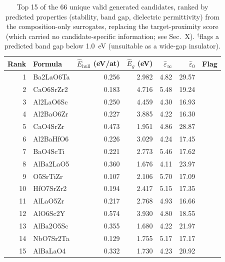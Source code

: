 \begin{table}[t]
\centering
\caption{Top 15 of the 66 unique valid generated candidates, ranked by predicted properties (stability, band gap, dielectric permittivity) from the composition-only surrogates, replacing the target-proximity score (which carried no candidate-specific information; see Sec.~X). $^\dagger$flags a predicted band gap below 1.0~eV (unsuitable as a wide-gap insulator).}
\label{tab:a5_candidate_ranking}
\begin{tabular}{rlrrrrr}
\toprule
Rank & Formula & $\hat{E}_{\mathrm{hull}}$ (eV/at) & $\hat{E}_g$ (eV) & $\hat\varepsilon_{\infty}$ & $\hat\varepsilon_{0}$ & Flag \\
\midrule
1 & Ba2LaO6Ta & 0.256 & 2.982 & 4.82 & 29.57 &  \\
2 & CaO6SrZr2 & 0.183 & 4.716 & 5.48 & 19.24 &  \\
3 & Al2LaO6Sc & 0.250 & 4.459 & 4.30 & 16.93 &  \\
4 & Al2BaO6Zr & 0.227 & 3.885 & 4.22 & 16.30 &  \\
5 & CaO4SrZr & 0.473 & 1.951 & 4.86 & 28.87 &  \\
6 & Al2BaHfO6 & 0.226 & 3.029 & 4.24 & 17.45 &  \\
7 & BaO4ScTi & 0.221 & 2.773 & 5.46 & 17.62 &  \\
8 & AlBa2LaO5 & 0.360 & 1.676 & 4.11 & 23.97 &  \\
9 & O5SrTiZr & 0.107 & 2.106 & 5.70 & 17.09 &  \\
10 & HfO7SrZr2 & 0.194 & 2.417 & 5.15 & 17.35 &  \\
11 & AlLaO5Zr & 0.217 & 2.768 & 4.93 & 16.66 &  \\
12 & AlO6Sc2Y & 0.574 & 3.930 & 4.80 & 18.55 &  \\
13 & AlBa2O5Sc & 0.355 & 1.680 & 4.22 & 21.97 &  \\
14 & NbO7Sr2Ta & 0.129 & 1.755 & 5.17 & 17.17 &  \\
15 & AlBaLaO4 & 0.332 & 1.730 & 4.23 & 20.92 &  \\
\bottomrule
\end{tabular}
\end{table}
